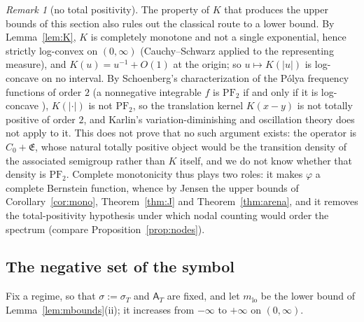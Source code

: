 \documentclass[11pt]{amsart}
\theoremstyle{definition}
\theoremstyle{remark}
\newtheorem{remark}[theorem]{Remark}
\newcommand{\sT}{\sigma_T}
\newcommand{\Lev}{\mathfrak E}
\newcommand{\Aconst}{\mathsf A_T}
\begin{document}
\begin{remark}[no total positivity]\label{rem:PF2}
The property of $K$ that produces the upper bounds of this section also rules out the classical route to
a lower bound. By Lemma~\ref{lem:K}, $K$ is completely monotone and not a single exponential, hence
strictly log-convex on $(0,\infty)$ (Cauchy--Schwarz applied to the representing measure), and
$K(u)=u^{-1}+O(1)$ at the origin; so $u\mapsto K(|u|)$ is log-concave on no interval. By Schoenberg's
characterization of the P\'olya frequency functions of order $2$ (a nonnegative integrable $f$ is
$\mathrm{PF}_2$ if and only if it is log-concave \cite{Schoenberg1951}), $K(|\cdot|)$ is not
$\mathrm{PF}_2$, so the translation kernel $K(x-y)$ is not totally positive of order $2$, and Karlin's
variation-diminishing and oscillation theory \cite{Karlin1968} does not apply to it. This does not prove
that no such argument exists: the operator is $C_0+\Lev$, whose natural totally positive object would be
the transition density of the associated semigroup rather than $K$ itself, and we do not know whether
that density is $\mathrm{PF}_2$. Complete monotonicity thus plays two roles: it makes $\varphi$ a complete
Bernstein function, whence by Jensen the upper bounds of Corollary~\ref{cor:mono}, Theorem~\ref{thm:J}
and Theorem~\ref{thm:arena}, and it removes the total-positivity hypothesis under which nodal counting
would order the spectrum (compare Proposition~\ref{prop:nodes}).
\end{remark}

\subsection{The negative set of the symbol}\label{subsec:band}

Fix a regime, so that $\sigma:=\sT$ and $\Aconst$ are fixed, and let $m_{\mathrm{lo}}$ be the lower bound of
Lemma~\ref{lem:mbounds}(ii); it increases from $-\infty$ to $+\infty$ on $(0,\infty)$.
\end{document}

